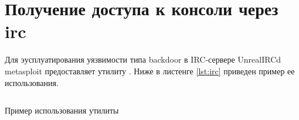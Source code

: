 \section{Получение доступа к консоли через irc}

Для эусплуатирования уязвимости типа backdoor в IRC-сервере UnrealIRCd metasploit предоставляет утилиту . 
Ниже в листенге \ref{lst:irc} приведен пример ее использования.

\begin{listing}[H]
    \inputminted{console}{resources/irc/00_irc}
    \caption{Пример использования утилиты }
    \label{lst:irc}
\end{listing}